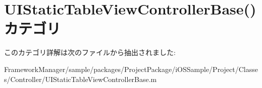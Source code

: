\hypertarget{category_u_i_static_table_view_controller_base_07_08}{}\section{U\+I\+Static\+Table\+View\+Controller\+Base() カテゴリ}
\label{category_u_i_static_table_view_controller_base_07_08}


このカテゴリ詳解は次のファイルから抽出されました\+:\begin{DoxyCompactItemize}
\item 
Framework\+Manager/sample/packages/\+Project\+Package/i\+O\+S\+Sample/\+Project/\+Classes/\+Controller/U\+I\+Static\+Table\+View\+Controller\+Base.\+m\end{DoxyCompactItemize}
